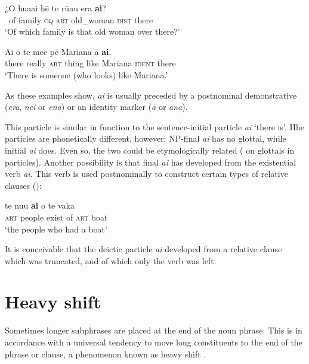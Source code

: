 \ea\label{ex:5.160}
\gll ¿O hua{\ꞌ}ai hē te rū{\ꞌ}au era \textbf{ai}? \\
~of family \textsc{cq} \textsc{art} old\_woman \textsc{dist} there \\

\glt 
‘Of which family is that old woman over there?’ \textstyleExampleref{[R413.305]} 
\z

\ea\label{ex:5.161}
\gll {\ꞌ}Ai {\ꞌ}ō te me{\ꞌ}e pē Mariana {\ꞌ}ā \textbf{ai}. \\
there really \textsc{art} thing like Mariana \textsc{ident} there \\

\glt
‘There is someone (who looks) like Mariana.’ \textstyleExampleref{[R415.423]} 
\z

As these examples show, \textit{ai} is usually preceded by a postnominal demonstrative (\textit{era}, \textit{nei} or \textit{ena}) or an identity marker (\textit{{\ꞌ}ā} or \textit{{\ꞌ}ana}). 

This particle is similar in function to the sentence-initial particle \textit{{\ꞌ}ai} ‘there is’. Hhe particles are phonetically different, however: NP{}-final \textit{ai} has no glottal, while initial \textit{{\ꞌ}ai} does. Even so, the two could be etymologically related ( on glottals in particles). Another possibility is that final \textit{ai} has developed from the existential verb \textit{ai}. This verb is used postnominally to construct certain types of relative clauses ():

\ea\label{ex:5.162}
\gll te nu{\ꞌ}u \textbf{ai} o te vaka\\
\textsc{art} people exist of \textsc{art} boat\\

\glt
‘the people who had a boat’ \textstyleExampleref{[R200.086]} 
\z
	
It is conceivable that the deictic particle \textit{ai} developed from a relative clause which was truncated, and of which only the verb was left.

\section{Heavy shift}\label{sec:5.11}
Sometimes longer subphrases are placed at the end of the noun phrase. This is in accordance with a universal tendency to move long constituents to the end of the phrase or clause, a phenomenon known as heavy shift \citep[326]{Payne1997}.

